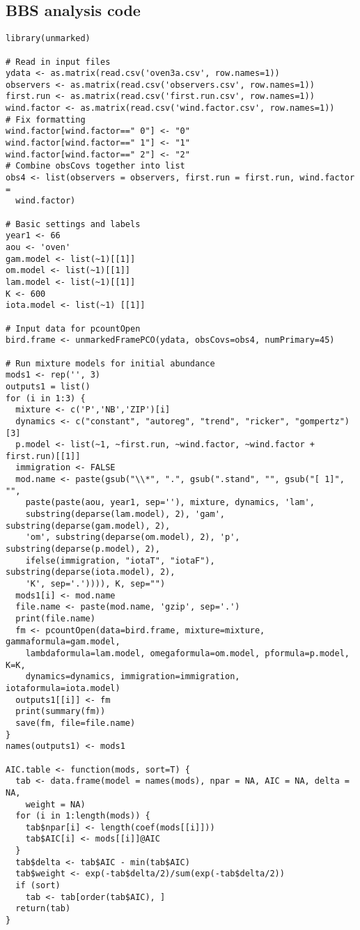 \documentclass[12pt]{article}
\begin{document}
\subsection{BBS analysis code}
\begin{verbatim}
library(unmarked)

# Read in input files
ydata <- as.matrix(read.csv('oven3a.csv', row.names=1))
observers <- as.matrix(read.csv('observers.csv', row.names=1))
first.run <- as.matrix(read.csv('first.run.csv', row.names=1))
wind.factor <- as.matrix(read.csv('wind.factor.csv', row.names=1))
# Fix formatting
wind.factor[wind.factor==" 0"] <- "0"
wind.factor[wind.factor==" 1"] <- "1"
wind.factor[wind.factor==" 2"] <- "2"
# Combine obsCovs together into list
obs4 <- list(observers = observers, first.run = first.run, wind.factor = 
  wind.factor)
  
# Basic settings and labels
year1 <- 66
aou <- 'oven'
gam.model <- list(~1)[[1]] 
om.model <- list(~1)[[1]] 
lam.model <- list(~1)[[1]] 
K <- 600
iota.model <- list(~1) [[1]]

# Input data for pcountOpen
bird.frame <- unmarkedFramePCO(ydata, obsCovs=obs4, numPrimary=45)

# Run mixture models for initial abundance  
mods1 <- rep('', 3)
outputs1 = list()
for (i in 1:3) {
  mixture <- c('P','NB','ZIP')[i]
  dynamics <- c("constant", "autoreg", "trend", "ricker", "gompertz")[3]
  p.model <- list(~1, ~first.run, ~wind.factor, ~wind.factor + first.run)[[1]]
  immigration <- FALSE
  mod.name <- paste(gsub("\\*", ".", gsub(".stand", "", gsub("[ 1]", "", 
    paste(paste(aou, year1, sep=''), mixture, dynamics, 'lam', 
    substring(deparse(lam.model), 2), 'gam', substring(deparse(gam.model), 2), 
    'om', substring(deparse(om.model), 2), 'p', substring(deparse(p.model), 2), 
    ifelse(immigration, "iotaT", "iotaF"), substring(deparse(iota.model), 2),
    'K', sep='.')))), K, sep="")
  mods1[i] <- mod.name
  file.name <- paste(mod.name, 'gzip', sep='.')
  print(file.name)
  fm <- pcountOpen(data=bird.frame, mixture=mixture, gammaformula=gam.model, 
    lambdaformula=lam.model, omegaformula=om.model, pformula=p.model, K=K, 
    dynamics=dynamics, immigration=immigration, iotaformula=iota.model)
  outputs1[[i]] <- fm
  print(summary(fm))
  save(fm, file=file.name)
}
names(outputs1) <- mods1

AIC.table <- function(mods, sort=T) {
  tab <- data.frame(model = names(mods), npar = NA, AIC = NA, delta = NA, 
    weight = NA)
  for (i in 1:length(mods)) {
    tab$npar[i] <- length(coef(mods[[i]]))
    tab$AIC[i] <- mods[[i]]@AIC
  }
  tab$delta <- tab$AIC - min(tab$AIC)
  tab$weight <- exp(-tab$delta/2)/sum(exp(-tab$delta/2))
  if (sort)
    tab <- tab[order(tab$AIC), ]
  return(tab)
}


\end{verbatim}
\end{document}
